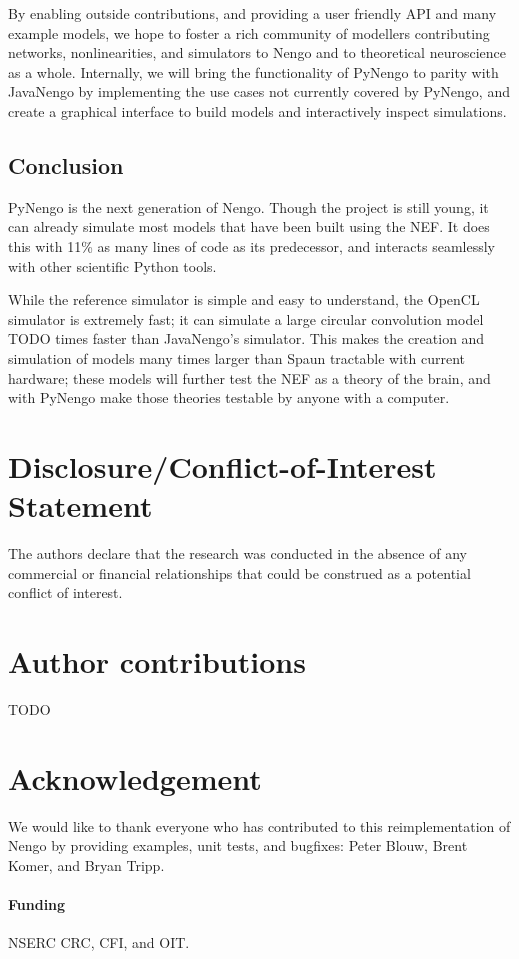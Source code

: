 \documentclass{frontiersSCNS}
\begin{document}
By enabling outside contributions,
and providing a user friendly API
and many example models,
we hope to foster a rich community of modellers
contributing networks, nonlinearities,
and simulators to Nengo
and to theoretical neuroscience
as a whole.
Internally, we will bring the functionality
of PyNengo to parity with JavaNengo
by implementing the use cases
not currently covered by PyNengo,
and create a graphical interface
to build models and
interactively inspect simulations.

\subsection{Conclusion}

PyNengo is the next generation of Nengo.
Though the project is still young,
it can already simulate most models
that have been built using the NEF.
It does this with 11\% as many lines of code
as its predecessor,
and interacts seamlessly with
other scientific Python tools.

While the reference simulator
is simple and easy to understand,
the OpenCL simulator is extremely fast;
it can simulate a large circular convolution model
TODO times faster than JavaNengo's simulator.
This makes the creation and simulation
of models many times larger than Spaun
tractable with current hardware;
these models will further test
the NEF as a theory of the brain,
and with PyNengo make those theories
testable by anyone with a computer.

\section*{Disclosure/Conflict-of-Interest Statement}

The authors declare that the research was conducted in the absence of
any commercial or financial relationships that could be construed as a
potential conflict of interest.

\section*{Author contributions}

TODO

\section*{Acknowledgement}

We would like to thank
everyone who has contributed
to this reimplementation of Nengo
by providing examples,
unit tests, and bugfixes:
Peter Blouw, Brent Komer, and Bryan Tripp.

\paragraph{Funding\textcolon}
NSERC CRC, CFI, and OIT.



\end{document}

